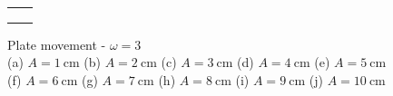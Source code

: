 \begin{figure}[H]
\begin{center}
\begin{tabular}{cc}
&
\\
&
\\
&
\\
\end{tabular}
\end{center}
\caption{Plate movement - $\omega=3$ \\ (a) $A=1\mathrm{~cm}$ (b) $A=2\mathrm{~cm}$ (c) $A=3\mathrm{~cm}$ (d) $A=4\mathrm{~cm}$ (e) $A=5\mathrm{~cm}$\\(f) $A=6\mathrm{~cm}$ (g) $A=7\mathrm{~cm}$ (h) $A=8\mathrm{~cm}$ (i) $A=9\mathrm{~cm}$ (j) $A=10\mathrm{~cm}$}
\label{Data_omega=3_plate}
\end{figure}

